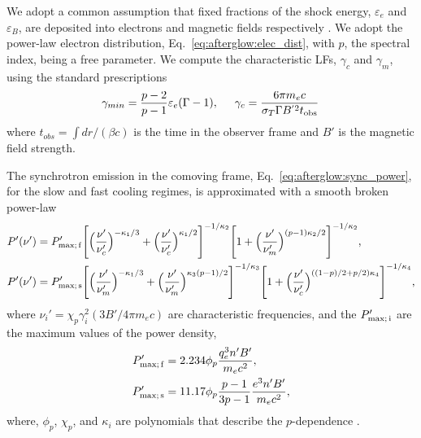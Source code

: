 We adopt a common assumption that fixed fractions of the shock  
energy, $\varepsilon_e$ and $\varepsilon_B$, are deposited into electrons 
and magnetic fields respectively \citep[\eg][]{Dermer:1997pv}. 
%
We adopt the power-law electron distribution, Eq.~\eqref{eq:afterglow:elec_dist}, 
with $p$, the spectral index, being a free parameter.
%
We compute the characteristic \acp{LF}, $\gamma_c$ and $\gamma_m$, using the standard
prescriptions \citep[\eg][]{Dermer:2008ev}
%
\begin{equation}
\label{eq:afterglow:gmin_gc}
\gamma_{min} = \frac{p - 2}{p - 1}  \varepsilon_e (\Gamma - 1) , \hspace{5mm} \gamma_c = \frac{6 \pi m_e c }{\sigma_T \Gamma B^{'2} t_{\rm obs}}\, 
\end{equation}
%
where $t_{obs} = \int dr / (\beta c)$ is the time in the 
observer frame and $B'$ is the magnetic field strength.

%
The synchrotron emission in the comoving frame, 
Eq.~\eqref{eq:afterglow:sync_power}, for the slow and fast cooling 
regimes, is approximated with a smooth broken power-law 
\citep{Johannesson:2006zs}
%
\begin{equation}
\begin{aligned}
P'(\nu') &= P_{\rm max;\, f}' \Bigg[\Big(\frac{\nu'}{\nu_c'}\Big)^{-\kappa_1/3} + \Big(\frac{\nu'}{\nu_c '}\Big)^{\kappa_1/2}\Bigg]^{-1/\kappa_2} \Bigg[1 + \Big(\frac{\nu'}{\nu_m '}\Big)^{(p-1)\kappa_2/2}\Bigg]^{-1/\kappa_2}, \\
P'(\nu') &= P_{\rm max;\, s}' \Bigg[\Big(\frac{\nu'}{\nu_m'}\Big)^{-\kappa_1/3} + \Big(\frac{\nu'}{\nu_m '}\Big)^{\kappa_3(p-1)/2}\Bigg]^{-1/\kappa_3} \Bigg[1 + \Big(\frac{\nu'}{\nu_c '}\Big)^{((1-p)/2 + p/2)\kappa_4}\Bigg]^{-1/\kappa_4},
\end{aligned}
\end{equation}
%
where $\nu_i ' = \chi_p \gamma_i^2 (3 B' / 4 \pi m_e c)$ 
are characteristic frequencies, and the 
$P_{\rm max;\, i}'$ are the maximum values of the power density, 
%
\begin{align}
P' _{\rm max;\, f} &= 2.234 \phi_p \frac{q_e^3 n' B'}{m_e c^2}, \\
P' _{\rm max;\, s} &= 11.17 \phi_p \frac{p-1}{3p-1}\frac{e^3 n' B'}{m_e c^2},
\end{align}
%
where, $\phi_p$, $\chi_p$, and $\kappa_i$ are polynomials that 
describe the $p$-dependence \citep{Johannesson:2006zs}.


